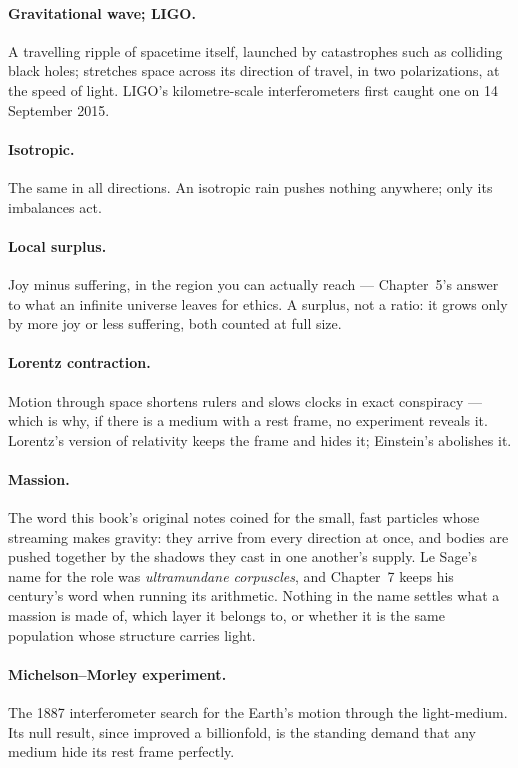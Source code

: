 \documentclass[fontsize=11pt,paper=a4,pagesize=auto,parskip=half-]{scrbook}
\begin{document}
\paragraph{Gravitational wave; LIGO.} A travelling ripple of spacetime itself, launched by catastrophes such as colliding black holes; stretches space across its direction of travel, in two polarizations, at the speed of light. LIGO's kilometre-scale interferometers first caught one on 14 September 2015.

\paragraph{Isotropic.} The same in all directions. An isotropic rain pushes nothing anywhere; only its imbalances act.

\paragraph{Local surplus.} Joy minus suffering, in the region you can actually reach --- Chapter~5's answer to what an infinite universe leaves for ethics. A surplus, not a ratio: it grows only by more joy or less suffering, both counted at full size.

\paragraph{Lorentz contraction.} Motion through space shortens rulers and slows clocks in exact conspiracy --- which is why, if there is a medium with a rest frame, no experiment reveals it. Lorentz's version of relativity keeps the frame and hides it; Einstein's abolishes it.

\paragraph{Massion.} The word this book's original notes coined for the small, fast particles whose streaming makes gravity: they arrive from every direction at once, and bodies are pushed together by the shadows they cast in one another's supply. Le Sage's name for the role was \emph{ultramundane corpuscles}, and Chapter~7 keeps his century's word when running its arithmetic. Nothing in the name settles what a massion is made of, which layer it belongs to, or whether it is the same population whose structure carries light.

\paragraph{Michelson--Morley experiment.} The 1887 interferometer search for the Earth's motion through the light-medium. Its null result, since improved a billionfold, is the standing demand that any medium hide its rest frame perfectly.
\end{document}
